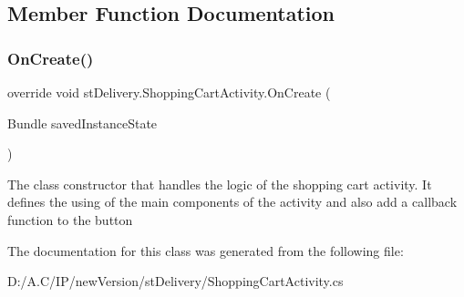 \subsection{Member Function Documentation}
\mbox{\label{classst_delivery_1_1_shopping_cart_activity_a4f3569f44a55df287d5ba1b967509abd}} 
\subsubsection{\texorpdfstring{On\+Create()}{OnCreate()}}
{\footnotesize\ttfamily override void st\+Delivery.\+Shopping\+Cart\+Activity.\+On\+Create (\begin{DoxyParamCaption}\item[{Bundle}]{saved\+Instance\+State }\end{DoxyParamCaption})\hspace{0.3cm}{\ttfamily [protected]}}



The class constructor that handles the logic of the shopping cart activity. It defines the using of the main components of the activity and also add a callback function to the button 



The documentation for this class was generated from the following file\+:\begin{DoxyCompactItemize}
\item 
D\+:/\+A.\+C/\+I\+P/new\+Version/st\+Delivery/Shopping\+Cart\+Activity.\+cs\end{DoxyCompactItemize}
